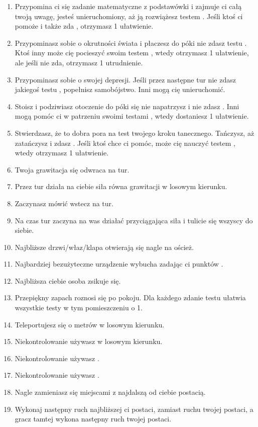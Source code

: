 \begin{enumerate}
	\item Przypomina ci się zadanie matematyczne z podstawówki i zajmuje ci całą twoją uwagę, jesteś unieruchomiony, aż ją rozwiążesz testem \abi{}. Jeśli ktoś ci pomoże i także zda \abi{}, otrzymasz 1 ułatwienie.
	\item Przypominasz sobie o okrutności świata i płaczesz do póki nie zdasz testu \abh{}. Ktoś inny może cię pocieszyć swoim testem \abt{}, wtedy otrzymasz 1 ułatwienie, ale jeśli nie zda, otrzymasz 1 utrudnienie.
	\item Przypominasz sobie o swojej depresji. Jeśli przez następne \dxx{} tur nie zdasz jakiegoś testu \abt{}, popełnisz samobójstwo. Inni mogą cię unieruchomić.
	\item Stoisz i podziwiasz otoczenie do póki się nie napatrzysz i nie zdasz \abp{}. Inni mogą pomóc ci w patrzeniu swoimi testami \abp{}, wtedy dostaniesz 1 ułatwienie.
	\item Stwierdzasz, że to dobra pora na test twojego kroku tanecznego. Tańczysz, aż zatańczysz i zdasz \aba{}. Jeśli ktoś chce ci pomóc, może cię nauczyć testem \aba{}, wtedy otrzymasz 1 ułatwienie.
	\item Twoja grawitacja się odwraca na \diiii{} tur.
	\item Przez \diiii{} tur działa na ciebie siła równa grawitacji w losowym kierunku.
	\item Zaczynasz mówić wstecz na \diiii{} tur.
	\item Na czas \diiii{} tur zaczyna na was działać przyciągająca siła i tulicie się wszyscy do siebie.
	\item Najbliższe drzwi/właz/klapa otwierają się nagle na oścież.
	\item Najbardziej bezużyteczne urządzenie wybucha zadając ci \diiii{} punktów \abzyc{}.
	\item Najbliższa ciebie osoba zsikuje się.
	\item Przepiękny zapach roznosi się po pokoju. Dla każdego zdanie testu \abt{} ułatwia wszystkie testy w tym pomieszczeniu o 1.
	\item Teleportujesz się o \diiii{} metrów w losowym kierunku.
	\item Niekontrolowanie używasz \absm{} w losowym kierunku.
	\item Niekontrolowanie używasz \abrm{}.
	\item Niekontrolowanie używasz \abdm{}.
	\item Nagle zamieniasz się miejscami z najdalszą od ciebie postacią.
	\item Wykonaj następny ruch najbliższej ci postaci, zamiast ruchu twojej postaci, a gracz tamtej wykona następny ruch twojej postaci.

\end{enumerate}
